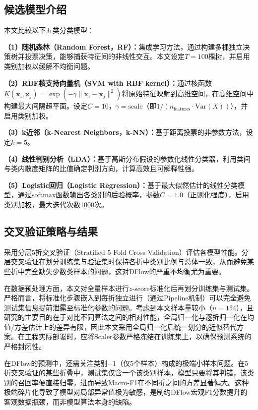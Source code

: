 \documentclass[UTF8,a4paper,12pt]{ctexart}
\begin{document}
\subsection{候选模型介绍}

本文比较以下五类分类模型：

\textbf{（1）随机森林（Random Forest，RF）：}集成学习方法，通过构建多棵独立决策树并投票决策，能够捕获特征间的非线性交互。本文设定$T=100$棵树，并启用类别加权以缓解不均衡问题。

\textbf{（2）RBF核支持向量机（SVM with RBF kernel）：}通过核函数$K(\bm{x}_i,\bm{x}_j)=\exp(-\gamma\|\bm{x}_i-\bm{x}_j\|^2)$将原始特征映射到高维空间，在高维空间中构建最大间隔超平面。设定$C=10$，$\gamma=\text{scale}$（即$1/(n_{\text{features}}\cdot\text{Var}(X))$），并启用类别加权。

\textbf{（3）k近邻（k-Nearest Neighbors，k-NN）：}基于距离投票的非参数方法，设定$k=5$。

\textbf{（4）线性判别分析（LDA）：}基于高斯分布假设的参数化线性分类器，利用类间与类内散度矩阵的比值确定判别方向，计算高效且可解释性强。

\textbf{（5）Logistic回归（Logistic Regression）：}基于最大似然估计的线性分类模型，通过$\text{softmax}$函数输出各类别的后验概率，参数$C=1.0$（正则化强度），启用类别加权，最大迭代次数1000次。

\subsection{交叉验证策略与结果}

采用分层5折交叉验证（Stratified 5-Fold Cross-Validation）评估各模型性能。分层交叉验证在划分训练集与验证集时保持各折中类别比例与总体一致，从而避免某些折中完全缺失少数类样本的问题，这对DFlow的严重不均衡尤为重要。

在数据预处理方面，本文对全量样本进行$z$-score标准化后再划分训练集与测试集。严格而言，将标准化步骤嵌入到每折独立进行（通过Pipeline机制）可以完全避免测试集信息提前泄露至标准化参数的问题。考虑到本文样本量较小（$n=154$），且研究的主要目的在于对比不同算法之间的相对性能，全局归一化与逐折归一化在均值/方差估计上的差异有限，因此本文采用全局归一化后统一划分的近似替代方案。在工程实际部署时，应将Scaler参数严格冻结在训练集上，以确保预测系统的严格封闭性。

在DFlow的预测中，还需关注类别$-1$（仅5个样本）构成的极端小样本问题。在5折交叉验证的某些折叠中，测试集仅含一个该类别样本，模型只要将其判错，该类别的召回率便直接归零，进而导致Macro-F1在不同折之间的方差显著偏大。这种极端碎片化导致了模型对局部异常值极为敏感，是制约DFlow宏观F1分数提升的客观数据瓶颈，而非模型算法本身的缺陷。
\end{document}
